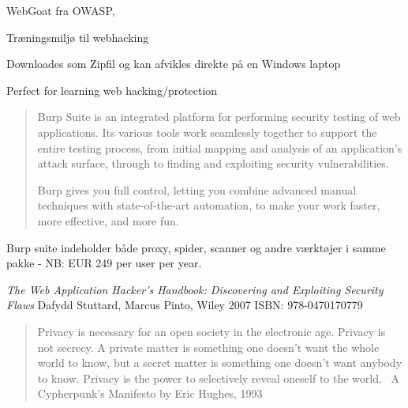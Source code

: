 \documentclass[20pt,landscape,a4paper,footrule]{foils}
\begin{document}


\begin{list1}
\item WebGoat fra OWASP, 
\item Træningsmiljø til webhacking
\item Downloades som Zipfil og kan afvikles direkte på en Windows laptop
\end{list1}




\centerline{Perfect for learning web hacking/protection}


\begin{quote}
Burp Suite is an integrated platform for performing security testing of web applications. Its various tools work seamlessly together to support the entire testing process, from initial mapping and analysis of an application's attack surface, through to finding and exploiting security vulnerabilities.

Burp gives you full control, letting you combine advanced manual techniques with state-of-the-art automation, to make your work faster, more effective, and more fun.
\end{quote}

Burp suite indeholder både proxy, spider, scanner og andre værktøjer i samme pakke - NB: EUR 249 per user per year.





\begin{list1}
\item \emph{The Web Application Hacker's Handbook: Discovering and Exploiting Security Flaws}
Dafydd Stuttard, Marcus Pinto, Wiley 2007 ISBN: 978-0470170779
\end{list1}






\begin{quote}
	Privacy is necessary for an open society in the electronic age. Privacy is not secrecy. A private matter is something one doesn't want the whole world to know, but a secret matter is something one doesn't want anybody to know. Privacy is the power to selectively reveal oneself to the world. ~A Cypherpunk's Manifesto by Eric Hughes, 1993
\end{quote}
\end{document}
